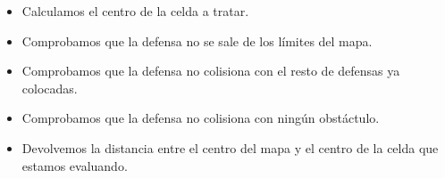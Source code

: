 \begin{itemize}
\item Calculamos el centro de la celda a tratar.
\item Comprobamos que la defensa no se sale de los límites del mapa.
\item Comprobamos que la defensa no colisiona con el resto de defensas ya colocadas.
\item Comprobamos que la defensa no colisiona con ningún obstáctulo.
\item Devolvemos la distancia entre el centro del mapa y el centro de la celda que estamos evaluando.
\end{itemize}
